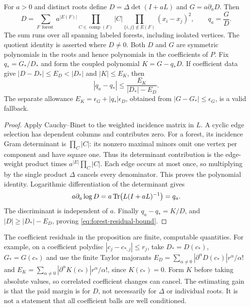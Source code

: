 \begin{proposition}
\label{prop:forest-filter}
For $a>0$ and distinct roots define $D=\Delta\det(I+aL)$ and $G=a\partial_aD$.
Then
\begin{equation}
 D=\sum_{F\,\operatorname{forest}}
     a^{|E(F)|}\prod_{C\in\operatorname{comp}(F)}|C|
     \prod_{\{i,j\}\notin E(F)}(x_i-x_j)^2,
 \qquad q_a=\frac GD.
 \label{eq:forest-polynomial}
\end{equation}
The sum runs over all spanning labeled forests, including isolated vertices.
The quotient identity is asserted where $D\ne0$. Both $D$ and $G$ are
symmetric polynomials in the roots and hence polynomials in the coefficients
of $P$. Fix $q_*=G_*/D_*$ and form the coupled polynomial $K=G-q_*D$.
If coefficient data give $|D-D_*|\le E_D<|D_*|$ and $|K|\le E_K$, then
\begin{equation}
 |q_a-q_*|\le\frac{E_K}{|D_*|-E_D}.
 \label{eq:forest-residual-bound}
\end{equation}
The separate allowance $E_K=\epsilon_G+|q_*|\epsilon_D$, obtained from
$|G-G_*|\le\epsilon_G$, is a valid fallback.
\end{proposition}
\begin{proof}
Apply Cauchy--Binet to the weighted incidence matrix in $L$.
A cyclic edge selection has dependent columns and contributes zero.
For a forest, its incidence Gram determinant is $\prod_C|C|$: its nonzero
maximal minors omit one vertex per component and have square one.
Thus its determinant contribution is the edge-weight product times
$a^{|E|}\prod_C|C|$. Each edge occurs at most once, so multiplying
by the single product $\Delta$ cancels every denominator. This proves the
polynomial identity. Logarithmic differentiation of the determinant gives
\[
 a\partial_a\log D=a\operatorname{Tr}\bigl(L(I+aL)^{-1}\bigr)=q_a.
\]
The discriminant is independent of $a$. Finally $q_a-q_*=K/D$, and
$|D|\ge|D_*|-E_D$, proving \eqref{eq:forest-residual-bound}.
\end{proof}

The coefficient residuals in the proposition are finite, computable quantities.
For example, on a coefficient polydisc $|c_j-c_{*,j}|\le r_j$, take
$D_*=D(c_*)$, $G_*=G(c_*)$ and use the finite Taylor majorants
$E_D=\sum_{\alpha\ne0}|\partial^\alpha D(c_*)|r^\alpha/\alpha!$
and
$E_K=\sum_{\alpha\ne0}|\partial^\alpha K(c_*)|r^\alpha/\alpha!$,
since $K(c_*)=0$. Form $K$ before taking absolute values, so correlated
coefficient changes can cancel. The estimating gain is that the paid
margin is for $D$, not necessarily for $\Delta$ or individual roots. It is
not a statement that all coefficient balls are well conditioned.

